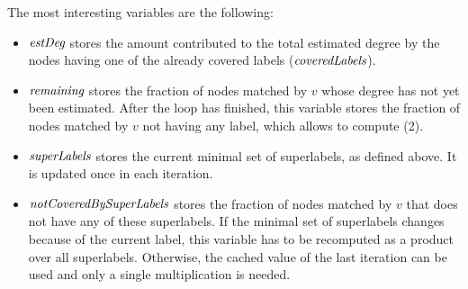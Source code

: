 The most interesting variables are the following:
\begin{itemize}
  \item $\textit{estDeg}$ stores the amount contributed to the total estimated degree
    by the nodes having one of the already covered labels ($\textit{coveredLabels}$).

  \item $\textit{remaining}$ stores the fraction of nodes matched by $v$ whose degree
    has not yet been estimated. After the loop has finished, this variable
    stores the fraction of nodes matched by $v$ not having any label, which
    allows to compute (2).

  \item $\textit{superLabels}$ stores the current minimal set of superlabels, as
    defined above. It is updated once in each iteration.

  \item $\textit{notCoveredBySuperLabels}$ stores the fraction of nodes matched by $v$
    that does not have any of these superlabels. If the minimal set of
    superlabels changes because of the current label, this variable has to be
    recomputed as a product over all superlabels.
    Otherwise, the cached value of the last iteration can be used and only a
    single multiplication is needed.
\end{itemize}

